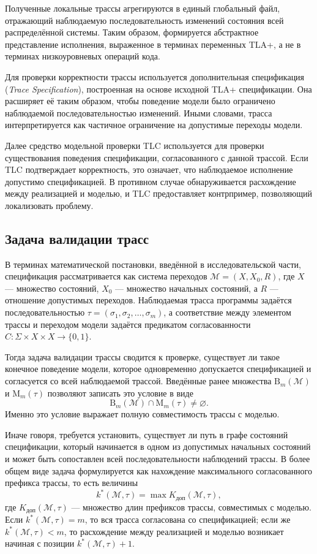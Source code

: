 Полученные локальные трассы агрегируются в единый глобальный файл, отражающий
наблюдаемую последовательность изменений состояния всей распределённой системы.
Таким образом, формируется абстрактное представление исполнения, выраженное в
терминах переменных TLA+, а не в терминах низкоуровневых операций кода.

Для проверки корректности трассы используется дополнительная спецификация
(\textit{Trace Specification}), построенная на основе исходной TLA+
спецификации. Она расширяет её таким образом, чтобы поведение модели было
ограничено наблюдаемой последовательностью изменений. Иными словами, трасса
интерпретируется как частичное ограничение на допустимые переходы модели.

Далее средство модельной проверки TLC используется для проверки существования
поведения спецификации, согласованного с данной трассой. Если TLC подтверждает
корректность, это означает, что наблюдаемое исполнение допустимо спецификацией.
В противном случае обнаруживается расхождение между реализацией и моделью, и
TLC предоставляет контрпример, позволяющий локализовать проблему.

\subsection{Задача валидации трасс}

В терминах математической постановки, введённой в исследовательской части,
спецификация рассматривается как система переходов $\mathcal{M} = (X, X_0, R)$,
где $X$ --- множество состояний, $X_0$ --- множество начальных состояний, а $R$
--- отношение допустимых переходов. Наблюдаемая трасса программы задаётся
последовательностью $\tau = (\sigma_1,\sigma_2,\dots,\sigma_m)$, а соответствие
между элементом трассы и переходом модели задаётся предикатом согласованности
$C : \Sigma \times X \times X \to \{0,1\}$.

Тогда задача валидации трассы сводится к проверке, существует ли такое конечное
поведение модели, которое одновременно допускается спецификацией и согласуется
со всей наблюдаемой трассой. Введённые ранее множества
$\mathrm{B}_m(\mathcal{M})$ и $\mathrm{M}_m(\tau)$ позволяют записать это
условие в виде
\[
\mathrm{B}_m(\mathcal{M}) \cap \mathrm{M}_m(\tau) \neq \varnothing.
\]
Именно это условие выражает полную совместимость трассы с моделью.

Иначе говоря, требуется установить, существует ли путь в графе состояний
спецификации, который начинается в одном из допустимых начальных состояний и
может быть сопоставлен всей последовательности наблюдений трассы. В более общем
виде задача формулируется как нахождение максимального согласованного префикса
трассы, то есть величины
\[
k^*(\mathcal{M},\tau)
=
\max K_{\mathrm{доп}}(\mathcal{M},\tau),
\]
где $K_{\mathrm{доп}}(\mathcal{M},\tau)$ --- множество длин
префиксов трассы, совместимых с моделью. Если
$k^*(\mathcal{M},\tau)=m$, то вся трасса согласована со
спецификацией; если же $k^*(\mathcal{M},\tau)<m$, то расхождение
между реализацией и моделью возникает начиная с позиции
$k^*(\mathcal{M},\tau)+1$.

